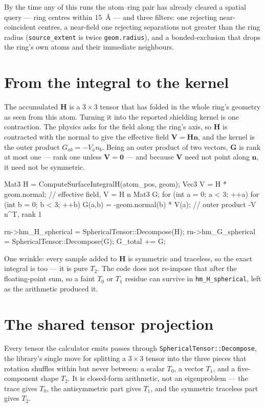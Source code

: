 \documentclass[11pt]{article}
\newcommand{\code}[1]{\texttt{#1}}
\begin{document}
By the time any of this runs the atom--ring pair has already cleared a spatial query
--- ring centres within \SI{15}{\angstrom} --- and three filters: one rejecting
near-coincident centres, a near-field one rejecting separations not greater than the ring radius
(\code{source\_extent} is twice \code{geom.radius}), and a bonded-exclusion that drops the
ring's own atoms and their immediate neighbours.

\section{From the integral to the kernel}

The accumulated \(\bm H\) is a \(3\times3\) tensor that has folded in the whole ring's
geometry as seen from this atom. Turning it into the reported shielding kernel is one
contraction. The physics asks for the field along the ring's axis, so \(\bm H\) is
contracted with the normal to give the effective field \(\bm V = \bm H\bm n\), and the
kernel is the outer product \(G_{ab} = -V_a n_b\). Being an outer product of two vectors,
\(\bm G\) is rank at most one --- rank one unless \(\bm V = \bm 0\) --- and because
\(\bm V\) need not point along \(\bm n\), it need not be symmetric.

\begin{codebox}
Mat3 H = ComputeSurfaceIntegralH(atom_pos, geom);
Vec3 V = H * geom.normal;                 // effective field, V = H n
Mat3 G;
for (int a = 0; a < 3; ++a)
    for (int b = 0; b < 3; ++b)
        G(a,b) = -geom.normal(b) * V(a);  // outer product -V n^T, rank 1

rn->hm_H_spherical = SphericalTensor::Decompose(H);
rn->hm_G_spherical = SphericalTensor::Decompose(G);
G_total += G;
\end{codebox}

One wrinkle: every sample added to \(\bm H\) is symmetric and traceless, so the exact
integral is too --- it is pure \(T_2\). The code does not re-impose that after the
floating-point sum, so a faint \(T_0\) or \(T_1\) residue can survive in
\code{hm\_H\_spherical}, left as the arithmetic produced it.

\section{The shared tensor projection}

Every tensor the calculator emits passes through \code{SphericalTensor::Decompose}, the
library's single move for splitting a \(3\times3\) tensor into the three pieces that
rotation shuffles within but never between: a scalar \(T_0\), a vector \(T_1\), and a
five-component shape \(T_2\). It is closed-form arithmetic, not an eigenproblem --- the
trace gives \(T_0\), the antisymmetric part gives \(T_1\), and the symmetric traceless
part gives \(T_2\).
\end{document}
